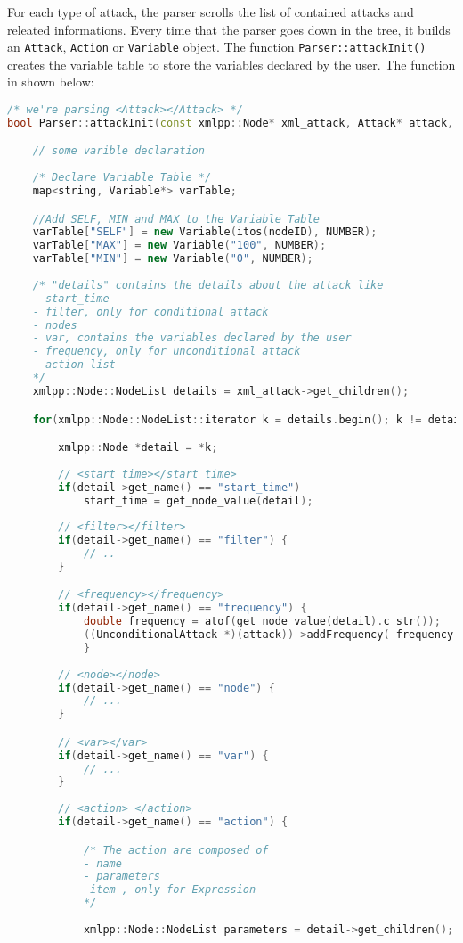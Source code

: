 For each type of attack, the parser scrolls the list of contained attacks and releated informations. Every time that the parser goes down in the tree, it builds an \texttt{Attack}, \texttt{Action} or \texttt{Variable} object.  
The function \texttt{Parser::attackInit()} creates the variable table to store the variables declared by the user. The function in shown below:
%
\begin{lstlisting}[language={cpp}]
/* we're parsing <Attack></Attack> */
bool Parser::attackInit(const xmlpp::Node* xml_attack, Attack* attack, SimTime& time){

	// some varible declaration
    
	/* Declare Variable Table */
	map<string, Variable*> varTable;

	//Add SELF, MIN and MAX to the Variable Table
	varTable["SELF"] = new Variable(itos(nodeID), NUMBER);
	varTable["MAX"] = new Variable("100", NUMBER);
	varTable["MIN"] = new Variable("0", NUMBER);
	
	/* "details" contains the details about the attack like  
	- start_time
	- filter, only for conditional attack
	- nodes
	- var, contains the variables declared by the user
	- frequency, only for unconditional attack
	- action list
	*/
	xmlpp::Node::NodeList details = xml_attack->get_children();

	for(xmlpp::Node::NodeList::iterator k = details.begin(); k != details.end(); ++k) {

		xmlpp::Node *detail = *k;
		
		// <start_time></start_time>
		if(detail->get_name() == "start_time")
			start_time = get_node_value(detail);
			
		// <filter></filter>
		if(detail->get_name() == "filter") {
			// ..			
		}	

		// <frequency></frequency>
		if(detail->get_name() == "frequency") {
			double frequency = atof(get_node_value(detail).c_str());
			((UnconditionalAttack *)(attack))->addFrequency( frequency );
	       	}
		
		// <node></node>
		if(detail->get_name() == "node") {
			// ...
		}

		// <var></var>
		if(detail->get_name() == "var") {
			// ...
		}
	
		// <action> </action>
		if(detail->get_name() == "action") {

			/* The action are composed of			
			- name
			- parameters
			 item , only for Expression
			*/
			
			xmlpp::Node::NodeList parameters = detail->get_children(); 


\end{lstlisting}
